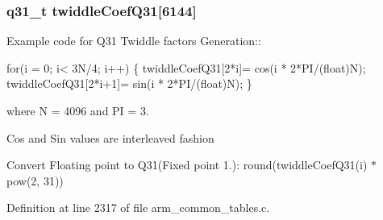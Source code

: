 \hypertarget{group___c_f_f_t___c_i_f_f_t_ga80f8f038faf4289eebc59dd5fa010993}{
\subsubsection[{twiddle\-Coef\-Q31}]{ {\bf q31\-\_\-t} twiddle\-Coef\-Q31\mbox{[}6144\mbox{]}}}\label{group___c_f_f_t___c_i_f_f_t_ga80f8f038faf4289eebc59dd5fa010993}
\begin{DoxyParagraph}{}
Example code for Q31 Twiddle factors Generation\-:\-: 
\end{DoxyParagraph}
\begin{DoxyParagraph}{}

\begin{DoxyPre}for(i = 0; i< 3N/4; i++)    
\{    
   twiddleCoefQ31[2*i]= cos(i * 2*PI/(float)N);    
   twiddleCoefQ31[2*i+1]= sin(i * 2*PI/(float)N);    
\} \end{DoxyPre}
 
\end{DoxyParagraph}
\begin{DoxyParagraph}{}
where N = 4096 and P\-I = 3. 
\end{DoxyParagraph}
\begin{DoxyParagraph}{}
Cos and Sin values are interleaved fashion 
\end{DoxyParagraph}
\begin{DoxyParagraph}{}
Convert Floating point to Q31(Fixed point 1.)\-: round(twiddle\-Coef\-Q31(i) $\ast$ pow(2, 31)) 
\end{DoxyParagraph}


Definition at line 2317 of file arm\-\_\-common\-\_\-tables.\-c.

